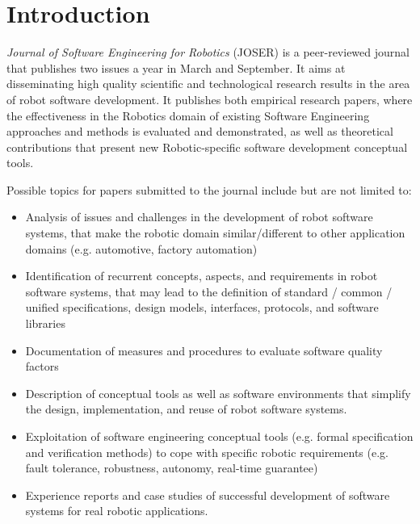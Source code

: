 \documentclass[10pt,journal,compsoc]{joser1}
\begin{document}
\maketitle


\section{Introduction}
 {\sl Journal of Software Engineering for
Robotics} (JOSER) is a peer-reviewed journal that publishes two
issues a year in March and September. It aims at disseminating
high quality scientific and technological research results in the
area of robot software development. It publishes both empirical
research papers, where the effectiveness in the Robotics domain of
existing Software Engineering approaches and methods is evaluated
and demonstrated, as well as theoretical contributions that
present new Robotic-specific software development conceptual
tools.

Possible topics for papers submitted to the journal include but
are not limited to:
\begin{itemize}
    \item Analysis of issues and challenges in the development of robot software systems, that make the robotic domain similar/different to other application domains (e.g. automotive, factory automation)
    \item Identification of recurrent concepts, aspects, and requirements in robot software systems, that may lead to the definition of standard / common / unified specifications, design models, interfaces, protocols, and software libraries
    \item Documentation of measures and procedures to evaluate software quality factors
    \item Description of conceptual tools as well as software environments that simplify the design, implementation, and reuse of robot software systems.
    \item Exploitation of software engineering conceptual tools (e.g. formal specification and verification methods) to cope with specific robotic requirements (e.g. fault tolerance, robustness, autonomy, real-time guarantee)
    \item Experience reports and case studies of successful development of software systems for real robotic applications.
\end{itemize}
\end{document}
